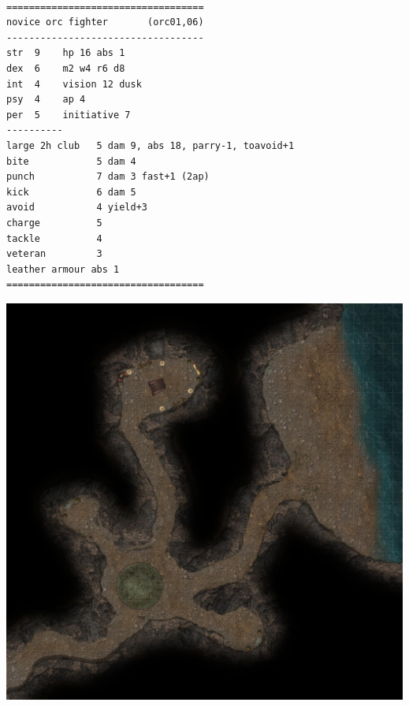\

\goodbreak \begin{samepage} \small \begin{verbatim}
===================================
novice orc fighter       (orc01,06)
-----------------------------------
str  9    hp 16 abs 1
dex  6    m2 w4 r6 d8
int  4    vision 12 dusk
psy  4    ap 4
per  5    initiative 7
----------
large 2h club   5 dam 9, abs 18, parry-1, toavoid+1
bite           	5 dam 4
punch          	7 dam 3 fast+1 (2ap)
kick            6 dam 5 
avoid          	4 yield+3
charge         	5
tackle         	4
veteran        	3
leather armour abs 1
===================================
\end{verbatim} \normalsize \end{samepage}






\clearpage
\thispagestyle{empty}

\null

\vfill

\noindent
\includegraphics[width=0.999\textwidth]{./map/cave.jpg}

\vfill







